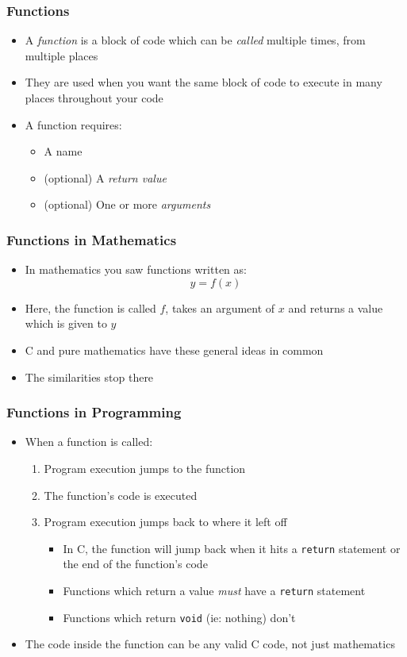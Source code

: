 \documentclass[14pt]{beamer}
\begin{document}
\begin{frame}
\frametitle{Functions}
\begin{itemize}
\item A \textit{function} is a block of code which can be \textit{called} multiple times, from multiple places
\item They are used when you want the same block of code to execute in many places throughout your code
\item A function requires:
	\begin{itemize}
		\item A name
		\item (optional) A \textit{return value}
		\item (optional) One or more \textit{arguments}
	\end{itemize}
\end{itemize}
\end{frame}

\begin{frame}
\frametitle{Functions in Mathematics}
\begin{itemize}
\item In mathematics you saw functions written as:
\begin{equation*}
y = f(x)
\end{equation*}
\item Here, the function is called $f$, takes an argument of $x$ and returns a value which is given to $y$
\item C and pure mathematics have these general ideas in common
\pause
\item The similarities stop there
\end{itemize}
\end{frame}

\begin{frame}[fragile]
\frametitle{Functions in Programming}
\begin{itemize}
\item When a function is called:
	\begin{enumerate}
		\item Program execution jumps to the function
		\item The function's code is executed
		\item Program execution jumps back to where it left off
			\begin{itemize}
				\item In C, the function will jump back when it hits a \texttt{return} statement or the end of the function's code
				\item Functions which return a value \textit{must} have a \texttt{return} statement
				\item Functions which return \texttt{void} (ie: nothing) don't
			\end{itemize}
	\end{enumerate}
\item The code inside the function can be any valid C code, not just mathematics
\end{itemize}
\end{frame}
\end{document}
